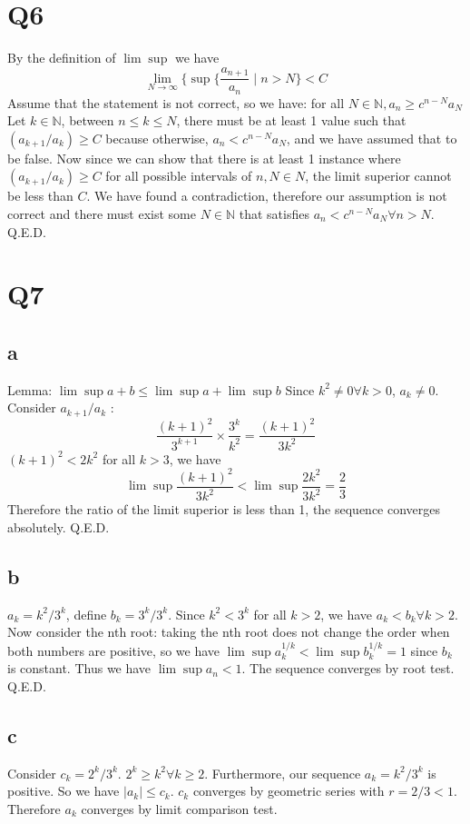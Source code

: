 \documentclass[12pt]{article}
\newcommand{\N}{\mathbb{N}}
\begin{document}
\section{Q6}
By the definition of $\lim \sup$ we have $$\lim _{N \to \infty}\{\sup \{\frac{a_{n+1}}{a_n}\mid n>N\}< C$$
\newline
Assume that the statement is not correct, so we have: for all $N \in \N, a_n \geq c^{n-N}a_N$
\newline
Let $k \in \N$, between $n \leq k \leq N$, there must be at least 1 value such that $(a_{k+1}/a_k) \geq C$ because otherwise, $a_n < c^{n-N}a_N$, and we have assumed that to be false. Now since we can show that there is at least 1 instance where $(a_{k+1}/a_k) \geq C$ for all possible intervals of $n,N \in N$, the limit superior cannot be less than $C$. \lightning
\newline
We have found a contradiction, therefore our assumption is not correct and there must exist some $N \in \N$ that satisfies $a_n < c^{n-N}a_N \forall n>N$. Q.E.D.
\newpage


\section{Q7}
\subsection{a}
Lemma: $\lim \sup a+b \leq \lim \sup a + \lim \sup b$
\newline
Since $k^2 \neq 0 \forall k>0$, $a_k \neq 0$. Consider $a_{k+1}/a_k$ :
$$\frac{(k+1)^2}{3^{k+1}}\times \frac{3^k}{k^2} = \frac{(k+1)^2}{3k^2}$$
$(k+1)^2 < 2k^2$ for all $k>3$, we have
$$\lim \sup \frac{(k+1)^2}{3k^2} < \lim \sup \frac{2k^2}{3k^2} = \frac{2}{3}$$
Therefore the ratio of the limit superior is less than 1, the sequence converges absolutely. Q.E.D.

\subsection{b}
$a_k = k^2/3^k$, define $b_k = 3^k/3^k$. Since $k^2<3^k$ for all $k>2$, we have $a_k<b_k \forall k>2$.
\newline
Now consider the nth root: taking the nth root does not change the order when both numbers are positive, so we have $\lim \sup a_k^{1/k} < \lim \sup b_k^{1/k} = 1$ since $b_k$ is constant.
\newline
Thus we have $\lim \sup a_n < 1$. The sequence converges by root test. Q.E.D.

\subsection{c}
Consider $c_k = 2^k/3^k$. $2^k \geq k^2 \forall k\geq 2$. Furthermore, our sequence $a_k = k^2/3^k$ is positive. So we have $|a_k|\leq c_k$. $c_k$ converges by geometric series with $r = 2/3<1$. Therefore $a_k$ converges by limit comparison test.
\end{document}
